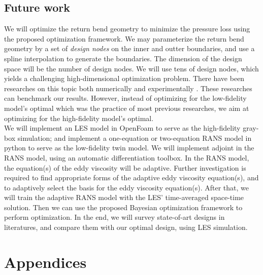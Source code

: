 \documentclass[a4paper,onecolumn]{article}
\theoremstyle{remark}
\begin{document}
\subsection{Future work}
\noindent We will optimize the return bend geometry to minimize the pressure loss using the
proposed optimization framework. We may parameterize the return bend
geometry by a set of \emph{design nodes} on the inner and outter boundaries, 
and use a spline interpolation to generate the
boundaries. The dimension of the design space will be the number of design nodes.
We will use tens of design nodes, which yields a challenging high-dimensional optimization problem.
There have been researches on this topic both numerically and experimentally
\cite{ubend rans opt 1, ubend rans opt 2}. These researches can benchmark our results.
However, instead of optimizing for the low-fidelity model's
optimal which was the practice of most previous researches,
we aim at optimizing for the high-fidelity model's optimal.\\

\noindent We will implement an LES model in OpenFoam to serve as the high-fidelity gray-box 
simulation; and implement a one-equation or two-equation RANS model in python to
serve as the low-fidelity twin model. We will implement adjoint in the RANS model, using
an automatic differentiation toolbox.
In the RANS model, the equation(s) of the eddy viscosity will be adaptive.
Further investigation is required to find appropriate forms of the adaptive 
eddy viscosity equation(s), and to adaptively select the basis for the eddy viscosity equation(s). 
After that, we will train the adaptive RANS model with the LES' time-averaged 
space-time solution. Then we can use the proposed Bayesian optimization framework 
to perform optimization. In the end, 
we will survey state-of-art designs in literatures, and compare them with
our optimal design, using LES simulation.\\



\newpage
\section{Appendices}
\end{document}

